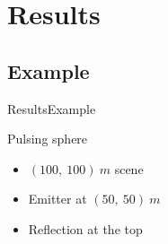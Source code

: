 \documentclass[9pt, xcolor={usenames, dvipsnames}]{beamer}
\begin{document}
		\section{Results}

			\subsection{Example}

				\begin{frame}{Results}{Example}
					\centering
					\begin{minipage}[c]{0.45\textwidth}
						\begin{figure}
						\end{figure}
					\end{minipage}
					\hfill
					\begin{minipage}[c]{0.5\textwidth}
						\begin{exampleblock}{Pulsing sphere}
							\begin{itemize}
								\item $(100,\ 100)\ m$ scene
								\item Emitter at $(50,\ 50)\ m$
								\item Reflection at the top
							\end{itemize}
						\end{exampleblock}
					\end{minipage}
				\end{frame}
\end{document}
